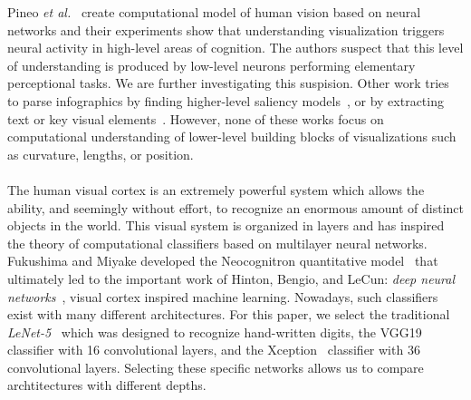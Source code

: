  Pineo \textit{et al.}~\cite{Pineo2012_computational_perception} create computational model of human vision based on neural networks and their experiments show that understanding visualization triggers neural activity in high-level areas of cognition. The authors suspect that this level of understanding is produced by low-level neurons performing elementary perceptional tasks. We are further investigating this suspision.
Other work tries to parse infographics by finding higher-level saliency models~\cite{bylinskii2016should}, or by extracting text or key visual elements~\cite{diagram_understanding,kembhavi2016diagram,zoya_text_visual_tags}. However, none of these works focus on computational understanding of lower-level building blocks of visualizations such as curvature, lengths, or position.
\\~\\
 The human visual cortex is an extremely powerful system which allows the ability, and seemingly without effort, to recognize an enormous amount of distinct objects in the world. This visual system is organized in layers and has inspired the theory of computational classifiers based on multilayer neural networks. Fukushima and Miyake developed the Neocognitron quantitative model~\cite{fukushima1982neocognitron} that ultimately led to the important work of Hinton, Bengio, and LeCun: \textit{deep neural networks}~\cite{lecun2015deep}, visual cortex inspired machine learning.
Nowadays, such classifiers exist with many different architectures. For this paper, we select the traditional \emph{LeNet-5}~\cite{lenet} which was designed to recognize hand-written digits, the VGG19~\cite{simonyan_very_deep2014} classifier with 16 convolutional layers, and the Xception~\cite{xception} classifier with 36 convolutional layers. Selecting these specific networks allows us to compare archtitectures with different depths.



